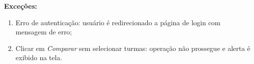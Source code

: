 \documentclass[
  12pt,       %
  openright,      %
  oneside,      %
  a4paper,      %
  english,      %
  french,        %
  spanish,     %
  brazil        %
  ]{abntex2-decsi}
\begin{document}
\begin{apendicesenv}
		\textbf{Exceções:}
		
			\begin{enumerate}	
				\item Erro de autenticação: usuário é redirecionado a página de login com mensagem de erro;
                \item Clicar em \textit{Comparar} sem selecionar turmas: operação não prossegue e alerta é exibido na tela.
			\end{enumerate}

	\newpage
	
\end{apendicesenv}



\end{document}
